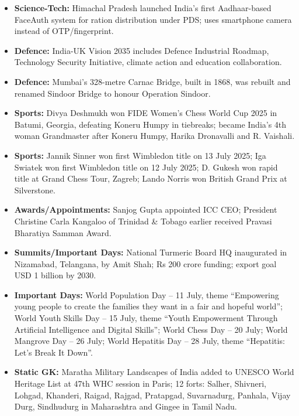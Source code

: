 \documentclass[10pt,a4paper]{article}
\begin{document}
\begin{itemize}
    \item \textbf{Science-Tech:} Himachal Pradesh launched India's first Aadhaar-based FaceAuth system for ration distribution under PDS; uses smartphone camera instead of OTP/fingerprint.
    \item \textbf{Defence:} India-UK Vision 2035 includes Defence Industrial Roadmap, Technology Security Initiative, climate action and education collaboration.
    \item \textbf{Defence:} Mumbai's 328-metre Carnac Bridge, built in 1868, was rebuilt and renamed Sindoor Bridge to honour Operation Sindoor.
    \item \textbf{Sports:} Divya Deshmukh won FIDE Women's Chess World Cup 2025 in Batumi, Georgia, defeating Koneru Humpy in tiebreaks; became India's 4th woman Grandmaster after Koneru Humpy, Harika Dronavalli and R. Vaishali.
    \item \textbf{Sports:} Jannik Sinner won first Wimbledon title on 13 July 2025; Iga Swiatek won first Wimbledon title on 12 July 2025; D. Gukesh won rapid title at Grand Chess Tour, Zagreb; Lando Norris won British Grand Prix at Silverstone.
    \item \textbf{Awards/Appointments:} Sanjog Gupta appointed ICC CEO; President Christine Carla Kangaloo of Trinidad \& Tobago earlier received Pravasi Bharatiya Samman Award.
    \item \textbf{Summits/Important Days:} National Turmeric Board HQ inaugurated in Nizamabad, Telangana, by Amit Shah; Rs 200 crore funding; export goal USD 1 billion by 2030.
    \item \textbf{Important Days:} World Population Day -- 11 July, theme ``Empowering young people to create the families they want in a fair and hopeful world''; World Youth Skills Day -- 15 July, theme ``Youth Empowerment Through Artificial Intelligence and Digital Skills''; World Chess Day -- 20 July; World Mangrove Day -- 26 July; World Hepatitis Day -- 28 July, theme ``Hepatitis: Let's Break It Down''.
    \item \textbf{Static GK:} Maratha Military Landscapes of India added to UNESCO World Heritage List at 47th WHC session in Paris; 12 forts: Salher, Shivneri, Lohgad, Khanderi, Raigad, Rajgad, Pratapgad, Suvarnadurg, Panhala, Vijay Durg, Sindhudurg in Maharashtra and Gingee in Tamil Nadu.
\end{itemize}
\end{document}
